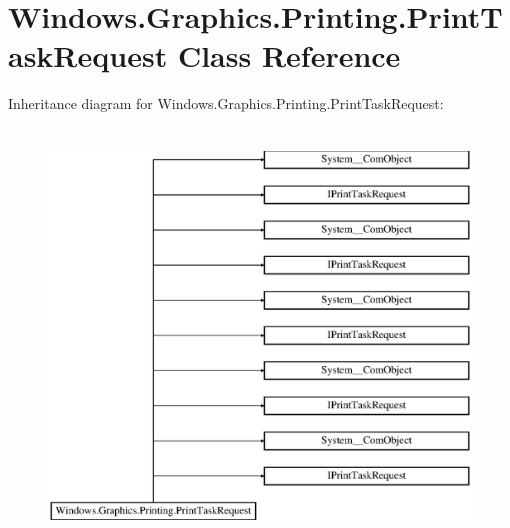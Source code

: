\hypertarget{class_windows_1_1_graphics_1_1_printing_1_1_print_task_request}{}\section{Windows.\+Graphics.\+Printing.\+Print\+Task\+Request Class Reference}
\label{class_windows_1_1_graphics_1_1_printing_1_1_print_task_request}
Inheritance diagram for Windows.\+Graphics.\+Printing.\+Print\+Task\+Request\+:\begin{figure}[H]
\begin{center}
\leavevmode
\includegraphics[height=11.000000cm]{class_windows_1_1_graphics_1_1_printing_1_1_print_task_request}
\end{center}
\end{figure}
